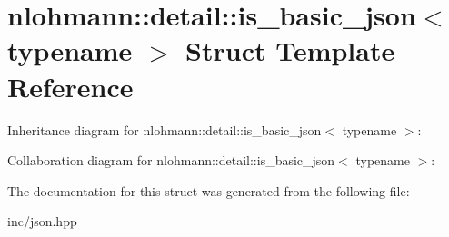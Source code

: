 \hypertarget{structnlohmann_1_1detail_1_1is__basic__json}{}\section{nlohmann\+:\+:detail\+:\+:is\+\_\+basic\+\_\+json$<$ typename $>$ Struct Template Reference}
\label{structnlohmann_1_1detail_1_1is__basic__json}


Inheritance diagram for nlohmann\+:\+:detail\+:\+:is\+\_\+basic\+\_\+json$<$ typename $>$\+:


Collaboration diagram for nlohmann\+:\+:detail\+:\+:is\+\_\+basic\+\_\+json$<$ typename $>$\+:


The documentation for this struct was generated from the following file\+:\begin{DoxyCompactItemize}
\item 
inc/json.\+hpp\end{DoxyCompactItemize}
